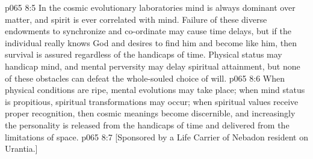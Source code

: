 \pc \vs p065 8:5 In the cosmic evolutionary laboratories mind is always dominant over matter, and spirit is ever correlated with mind. Failure of these diverse endowments to synchronize and co\hyp{}ordinate may cause time delays, but if the individual really knows God and desires to find him and become like him, then survival is assured regardless of the handicaps of time. Physical status may handicap mind, and mental perversity may delay spiritual attainment, but none of these obstacles can defeat the whole\hyp{}souled choice of will.
\vs p065 8:6 When physical conditions are ripe,  mental evolutions may take place; when mind status is propitious,  spiritual transformations may occur; when spiritual values receive proper recognition, then cosmic meanings become discernible, and increasingly the personality is released from the handicaps of time and delivered from the limitations of space.
\vsetoff
\vs p065 8:7 [Sponsored by a Life Carrier of Nebadon resident on Urantia.]
